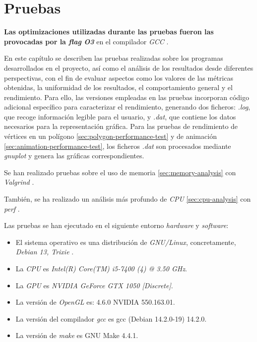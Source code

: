 \chapter{Pruebas} \label{chp:tests}

\textbf{Las optimizaciones utilizadas durante las pruebas fueron las provocadas por la \textit{flag} \textit{O3}} en el compilador \textit{GCC} \cite{webGccOptimizationOptions}.

En este capítulo se describen las pruebas realizadas sobre los programas desarrollados en el proyecto, así como el análisis de los resultados desde diferentes perspectivas, con el fin de evaluar aspectos como los valores de las métricas obtenidas, la uniformidad de los resultados, el comportamiento general y el rendimiento. Para ello, las versiones empleadas en las pruebas incorporan código adicional específico para caracterizar el rendimiento, generando dos ficheros: \textit{.log}, que recoge información legible para el usuario, y \textit{.dat}, que contiene los datos necesarios para la representación gráfica. Para las pruebas de rendimiento de vértices en un polígono \ref{sec:polygon-performance-test} y de animación \ref{sec:animation-performance-test}, los ficheros \textit{.dat} son procesados mediante \textit{gnuplot} y genera las gráficas correspondientes.

Se han realizado pruebas sobre el uso de memoria \ref{sec:memory-analysis} con \textit{Valgrind} \cite{webValgrind}.

También, se ha realizado un análisis más profundo de \textit{CPU} \ref{sec:cpu-analysis} con \textit{perf} \cite{webPerf}.

Las pruebas se han ejecutado en el siguiente entorno \textit{hardware} y \textit{software}:

\begin{itemize}

    \item El sistema operativo es una distribución de \textit{GNU/Linux}, concretamente, \textit{Debian 13, Trixie} \cite{webDebian}.
    
    \item La \textit{CPU} es \textit{Intel(R) Core(TM) i5-7400 (4) @ 3.50 GHz}.

    \item La \textit{GPU} es \textit{NVIDIA GeForce GTX 1050 [Discrete]}.

    \item La versión de \textit{OpenGL} es: 4.6.0 NVIDIA 550.163.01.

    \item La versión del compilador \textit{gcc} es gcc (Debian 14.2.0-19) 14.2.0.

    \item La versión de \textit{make} es GNU Make 4.4.1.
    
\end{itemize}

